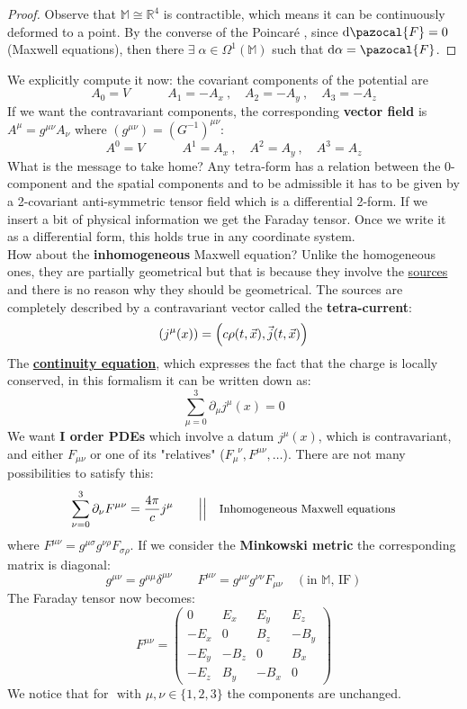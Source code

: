 \documentclass[../main.tex]{subfiles}
\begin{document}
\begin{proof}
Observe that $\mathbb{M}\cong\mathbb{R}^4$ is contractible, which means it can be continuously deformed to a point. By the converse of the Poincaré , since {\color{red}$\dd{\pazocal{F}}=0$ (Maxwell equations)}, then there $\exists\;\alpha\in\Omega^1(\mathbb{M})$ such that $\dd{\alpha}=\pazocal{F}$.
\end{proof}
We explicitly compute it now: the covariant components of the potential are
\[
A_0=V \quad\qquad A_1=-A_x \ ,\quad A_2=-A_y \ ,\quad A_3=-A_z
\]
If we want the contravariant components, the corresponding \textbf{vector field} is {\color{red}$A^{\mu}=g^{\mu\nu}A_{\nu}$} where $\left(g^{\mu\nu}\right)=(G^{-1})^{\mu\nu}$:
\[
A^0=V \quad\qquad A^1=A_x \ ,\quad A^2=A_y \ ,\quad A^3=A_z
\]
What is the message to take home? Any tetra-form has a relation between the 0-component and the spatial components and to be admissible it has to be given by a 2-covariant anti-symmetric tensor field which is a differential 2-form. If we insert a bit of physical information we get the Faraday tensor. Once we write it as a differential form, this holds true in any coordinate system.\\
How about the \textbf{inhomogeneous} Maxwell equation? Unlike the homogeneous ones, they are partially geometrical but that is because they involve the \underline{sources} and there is no reason why they should be geometrical. The sources are completely described by a contravariant vector called the \textbf{tetra-current}:
\[
\pqty{j^{\mu}(x)}=\left(c\rho(t,\vec{x}),\vec{j}(t,\vec{x})\right)
\]
The \underline{\textbf{continuity equation}}, which expresses the fact that the charge is locally conserved, in this formalism it can be written down as:
\[
\sum_{\mu=0}^3\partial_{\mu}j^{\mu}(x)=0
\]
We want \textbf{I order PDEs} which involve a datum $j^{\mu}(x)$, which is contravariant, and either $F_{\mu\nu}$ or one of its "relatives" ($F_{\mu}^{\;\;\nu},F^{\mu\nu},\dots$). There are not many possibilities to satisfy this:
\[
\sum_{\nu=0}^3\partial_{\nu}F^{\mu\nu}=\frac{4\pi}{c}j^{\mu} \qquad \Big| \Big| \quad \small{\text{Inhomogeneous Maxwell equations}}
\]
where $F^{\mu\nu}=g^{\mu\sigma}g^{\nu\rho}F_{\sigma\rho}$. If we consider the \textbf{Minkowski metric} the corresponding matrix is diagonal:
\[
g^{\mu\nu}=g^{\mu\mu}\delta^{\mu\nu} \qquad F^{\mu\nu}=g^{\mu\nu}g^{\nu\nu}F_{\mu\nu} \quad (\textrm{in $\mathbb{M}$, IF})
\]
The Faraday tensor now becomes:
\[
F^{\mu\nu}=\begin{pmatrix}
0 & E_x & E_y & E_z \\
-E_x & 0 & B_z & -B_y \\
-E_y & -B_z & 0 & B_x \\
-E_z & B_y & -B_x & 0
\end{pmatrix}
\]
We notice that for $\text{ with } \mu,\nu\in\{1,2,3\}$ the components are unchanged.
\end{document}
